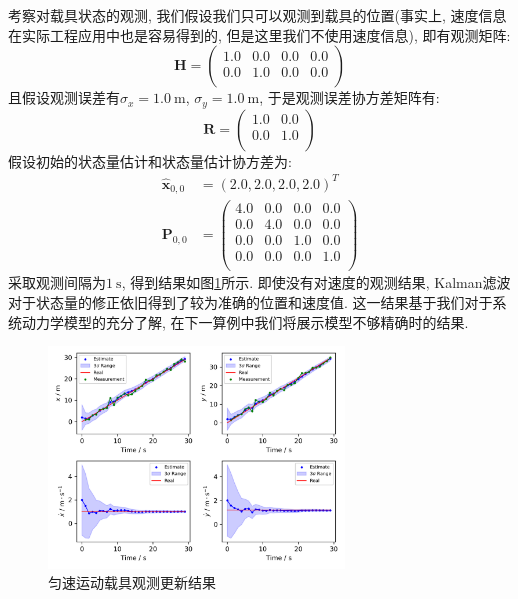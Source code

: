 \documentclass[12pt]{article}
\begin{document}
考察对载具状态的观测, 我们假设我们只可以观测到载具的位置(事实上, 速度信息在实际工程应用中也是容易得到的, 但是这里我们不使用速度信息), 即有观测矩阵:
\begin{equation*}
\bm{H} = 
   \begin{pmatrix} %
      1.0 & 0.0 & 0.0 & 0.0\\
      0.0 & 1.0 & 0.0 & 0.0 \\
   \end{pmatrix}
\end{equation*}
且假设观测误差有$\sigma_x = 1.0 \ \mathrm{m}$, $\sigma_y = 1.0 \ \mathrm{m}$, 于是观测误差协方差矩阵有:
\begin{equation*}
\bm{R} = 
   \begin{pmatrix} %
      1.0 & 0.0 \\
      0.0 & 1.0 \\
   \end{pmatrix}
\end{equation*}
假设初始的状态量估计和状态量估计协方差为:
\begin{equation*}
\begin{aligned}
\hat{\bm{x}}_{0,0} &= (2.0, 2.0, 2.0, 2.0)^T \\
\bm{P}_{0,0} &=  
   \begin{pmatrix} %
      4.0 & 0.0 & 0.0 & 0.0\\
      0.0 & 4.0 & 0.0 & 0.0 \\
      0.0 & 0.0 & 1.0 & 0.0 \\
      0.0 & 0.0 & 0.0 & 1.0 \\
   \end{pmatrix}
\end{aligned}
\end{equation*}
采取观测间隔为$1 \ \mathrm{s}$, 得到结果如图\ref{fig:exp2}所示. 即使没有对速度的观测结果, Kalman滤波对于状态量的修正依旧得到了较为准确的位置和速度值. 这一结果基于我们对于系统动力学模型的充分了解, 在下一算例中我们将展示模型不够精确时的结果. 
\begin{figure}[htbp] %
   \centering
   \includegraphics[width=0.7\textwidth]{./figures/exp2} 
   \caption{匀速运动载具观测更新结果}
   \label{fig:exp2}
\end{figure} 
\end{document}
